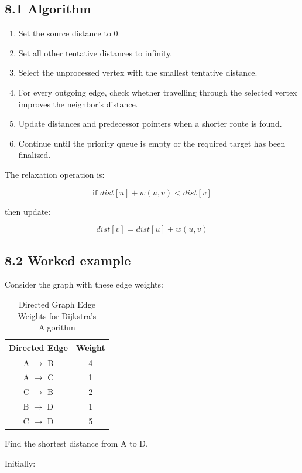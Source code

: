 \subsection{8.1 Algorithm}

\begin{enumerate}
    \item Set the source distance to 0.
    \item Set all other tentative distances to infinity.
    \item Select the unprocessed vertex with the smallest tentative distance.
    \item For every outgoing edge, check whether travelling through the selected vertex improves the neighbor's distance.
    \item Update distances and predecessor pointers when a shorter route is found.
    \item Continue until the priority queue is empty or the required target has been finalized.
\end{enumerate}

The relaxation operation is:


\[
\boxed{\text{if }dist[u]+w(u,v)<dist[v]}
\]


then update:


\[
dist[v]=dist[u]+w(u,v)
\]


\subsection{8.2 Worked example}

Consider the graph with these edge weights:

\begin{table}[htbp]
\centering
\caption{Directed Graph Edge Weights for Dijkstra's Algorithm}
\label{tab:dijkstra_edges}
\begin{tabular}{cc}
\toprule
\textbf{Directed Edge} & \textbf{Weight} \\
\midrule
A $\to$ B & 4 \\
A $\to$ C & 1 \\
C $\to$ B & 2 \\
B $\to$ D & 1 \\
C $\to$ D & 5 \\
\bottomrule
\end{tabular}
\end{table}

Find the shortest distance from A to D.

Initially:


